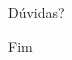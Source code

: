 \documentclass{beamer}
\begin{document}

\begin{frame}
\Huge{\centerline{Dúvidas?}}
\end{frame}


\begin{frame}
\Huge{\centerline{Fim}}
\end{frame}

\end{document}
